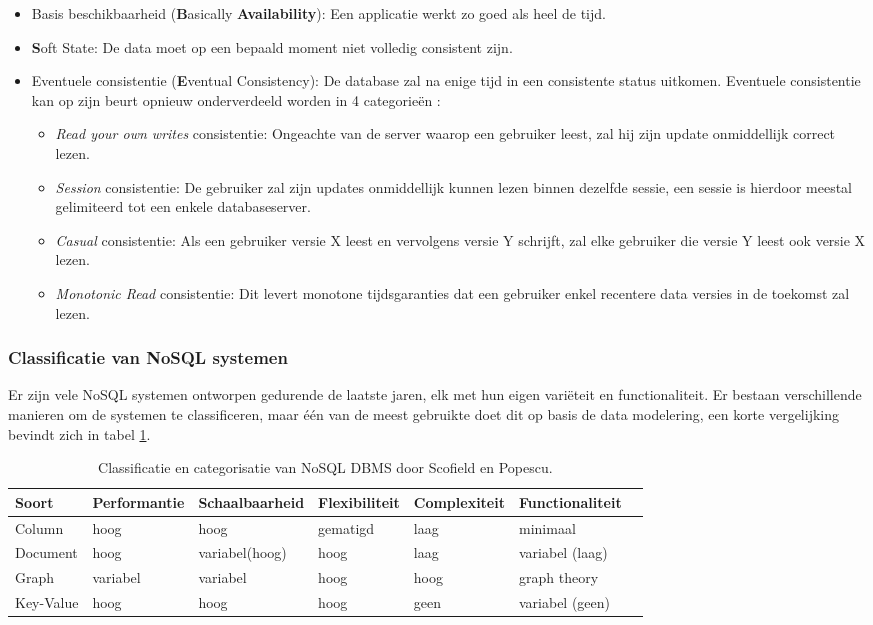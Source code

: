 \begin{itemize}
 \item Basis beschikbaarheid (\textbf{B}asically \textbf{Availability}): Een applicatie werkt zo goed als heel de tijd.
 \item \textbf{S}oft State: De data moet op een bepaald moment niet volledig consistent zijn. 
 \item Eventuele consistentie (\textbf{E}ventual Consistency): De database zal na enige tijd in een consistente status uitkomen. Eventuele consistentie kan op zijn beurt opnieuw onderverdeeld worden in 4 categorieën \cite[slide 16]{lipcon2009design}:  
 	\begin{itemize}
 		\item \textit{Read your own writes} consistentie: Ongeachte van de server waarop een gebruiker leest, zal hij zijn update onmiddellijk correct lezen. 
 		\item \textit{Session} consistentie: De gebruiker zal zijn updates onmiddellijk kunnen lezen binnen dezelfde sessie, een sessie is hierdoor meestal gelimiteerd tot een enkele databaseserver. 
 		\item \textit{Casual} consistentie: Als een gebruiker versie X leest en vervolgens versie Y schrijft, zal elke gebruiker die versie Y leest ook versie X lezen.
 		\item \textit{Monotonic Read} consistentie: Dit levert monotone tijdsgaranties dat een gebruiker enkel recentere data versies in de toekomst zal lezen. 
 	\end{itemize}
\end{itemize}

\subsubsection{Classificatie van NoSQL systemen}
Er zijn vele NoSQL systemen ontworpen gedurende de laatste jaren, elk met hun eigen variëteit en functionaliteit. Er bestaan verschillende manieren om de systemen te classificeren, maar één van de meest gebruikte doet dit op basis de data modelering, een korte vergelijking bevindt zich in tabel \ref{table:selectie-classificatie}.  

\begin{table}[!h]
	\resizebox{\textwidth}{!} {
		\begin{tabular}{l l l l l l l}
			\textbf{Soort} & \textbf{Performantie} & \textbf{Schaalbaarheid} & 			\textbf{Flexibiliteit} & \textbf{Complexiteit} & \textbf{Functionaliteit} \\ \hline
			Column & hoog & hoog & gematigd & laag & minimaal \\
			Document & hoog & variabel(hoog) & hoog & laag & variabel (laag) \\
			Graph & variabel & variabel & hoog & hoog & graph theory \\
			Key-Value & hoog & hoog & hoog & geen & variabel (geen) \\
		\end{tabular}
	}
	\caption{Classificatie en categorisatie van NoSQL DBMS door Scofield en Popescu. \cite{categorizatie-sco10} \cite{categorizatie-pop10b} }
	\label{table:selectie-classificatie}
\end{table} 

